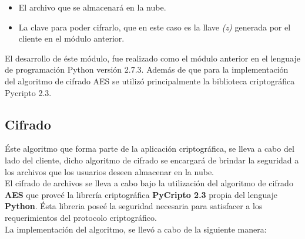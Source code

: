 	\begin{itemize}
	\item El archivo que se almacenará en la nube.
	\item La clave para poder cifrarlo, que en este caso es la llave \textit{(z)} generada por el cliente en el módulo anterior. 
	\end{itemize}
El desarrollo de éste módulo, fue realizado como el módulo anterior en el lenguaje de programación Python versión 2.7.3. Además de que para la implementación del algoritmo de cifrado AES se utilizó principalmente la biblioteca criptográfica Pycripto 2.3. 


\subsection{Cifrado}
Éste algoritmo que forma parte de la aplicación criptográfica, se lleva a cabo del lado del cliente, dicho algoritmo de cifrado se encargará de brindar la seguridad a los archivos que los usuarios deseen almacenar en la nube. \\
El cifrado de archivos se lleva a cabo bajo la utilización del algoritmo de cifrado \textbf{AES} que proveé la librería criptográfica \textbf{PyCripto 2.3} propia del lenguaje \textbf{Python}. Ésta libreria poseé la seguridad necesaria para satisfacer a los requerimientos del protocolo criptográfico.  \\ 
La implementación del algoritmo, se llevó a cabo de la siguiente manera: 

